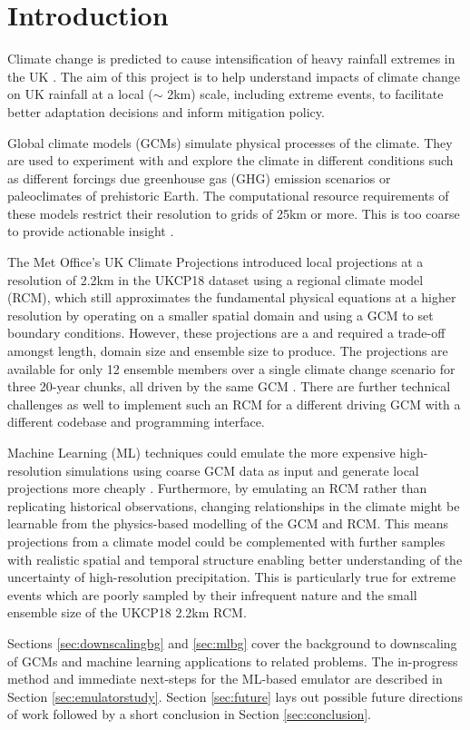 \section{Introduction}

Climate change is predicted to cause intensification of heavy rainfall extremes in the UK \cite{donat2016precipextreme, kendon2019ukcpscience}. The aim of this project is to help understand impacts of climate change on UK rainfall at a local (\(\sim\) 2km) scale, including extreme events, to facilitate better adaptation decisions and inform mitigation policy.

Global climate models (GCMs) simulate physical processes of the climate. They are used to experiment with and explore the climate in different conditions such as different forcings due greenhouse gas (GHG) emission scenarios or paleoclimates of prehistoric Earth. The computational resource requirements of these models restrict their resolution to grids of 25km or more. This is too coarse to provide actionable insight \cite{gutierrez2019sdcomparison}.

The Met Office's UK Climate Projections introduced local projections at a resolution of 2.2km in the UKCP18 dataset \cite{ukcp18local} using a regional climate model (RCM), which still approximates the fundamental physical equations at a higher resolution by operating on a smaller spatial domain and using a GCM to set boundary conditions. However, these projections are a \cite{kendon2019ukcpscience} and required a trade-off amongst length, domain size and ensemble size to produce. The projections are available for only 12 ensemble members over a single climate change scenario for three 20-year chunks, all driven by the same GCM \cite{kendon2019ukcpscience}. There are further technical challenges as well to implement such an RCM for a different driving GCM with a different codebase and programming interface.

Machine Learning (ML) techniques could emulate the more expensive high-resolution simulations using coarse GCM data as input and generate local projections more cheaply \cite{vandal2018mldownscaling, gentine2018mlsuperparam, rasp2018dlsubgridclimmodel}. Furthermore, by emulating an RCM rather than replicating historical observations, changing relationships in the climate might be learnable from the physics-based modelling of the GCM and RCM. This means projections from a climate model could be complemented with further samples with realistic spatial and temporal structure enabling better understanding of the uncertainty of high-resolution precipitation. This is particularly true for extreme events which are poorly sampled by their infrequent nature and the small ensemble size of the UKCP18 2.2km RCM.

Sections \ref{sec:downscalingbg} and \ref{sec:mlbg} cover the background to downscaling of GCMs and machine learning applications to related problems. The in-progress method and immediate next-steps for the ML-based emulator are described in Section \ref{sec:emulatorstudy}. Section \ref{sec:future} lays out possible future directions of work followed by a short conclusion in Section \ref{sec:conclusion}.
